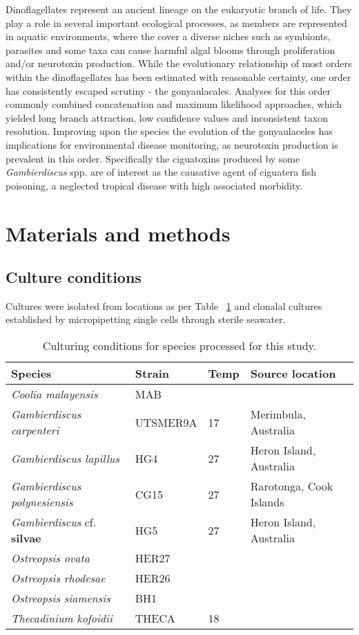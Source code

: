 \documentclass[12pt]{article}
\begin{document}
Dinoflagellates represent an ancient lineage on the eukaryotic branch of life. 
They play a role in several important ecological processes, as members are represented in aquatic environments, where the cover a diverse niches such as symbionts, parasites and some taxa can cause harmful algal blooms through proliferation and/or neurotoxin production.
While the evolutionary relationship of most orders within the dinoflagellates has been estimated with reasonable certainty, one order has consistently escaped scrutiny - the gonyaulacales. 
Analyses for this order commonly combined concatenation and maximum likelihood approaches, which yielded long branch attraction, low confidence values and inconsistent taxon resolution. 
Improving upon the species the evolution of the gonyaulaceles has implications for environmental disease monitoring, as neurotoxin production is prevalent in this order. 
Specifically the ciguatoxins produced by some \emph{Gambierdiscus} spp. are of interest as the causative agent of ciguatera fish poisoning, a neglected tropical disease with high associated morbidity.%


\newpage

\section{Materials and methods}
\subsection*{Culture conditions}
Cultures were isolated from locations as per Table ~\ref{tbl:strainTable} and clonalal cultures established by micropipetting single cells through sterile seawater. 

\FloatBarrier
\begin{table}
\caption{Culturing conditions for species processed for this study.}
\label{tbl:strainTable}
\begin{tabular}{ | p{3cm} | p{1.5cm} | p{1.5cm} | p{6cm} |}
\hline
\textbf{Species} & \textbf{Strain}& \textbf{Temp} & \textbf{Source location} \\
\hline
\textit{Coolia malayensis}&MAB&& \\
\hline
\textit{Gambierdiscus carpenteri}&UTSMER9A&17&Merimbula, Australia\\
\hline
\textit{Gambierdiscus lapillus}&HG4&27&Heron Island, Australia\\
\hline
\textit{Gambierdiscus polynesiensis}&CG15&27&Rarotonga, Cook Islands\\
\hline
\textit{Gambierdiscus} cf. \textbf{silvae}&HG5&27&Heron Island, Australia\\
\hline
\textit{Ostreopsis ovata}&HER27&&\\
\hline
\textit{Ostreopsis rhodesae}&HER26&&\\
\hline
\textit{Ostreopsis siamensis}&BH1&&\\
\hline
\textit{Thecadinium kofoidii}&THECA&18&\\
\hline
\end{tabular}
\end{table}
\FloatBarrier
\end{document}

